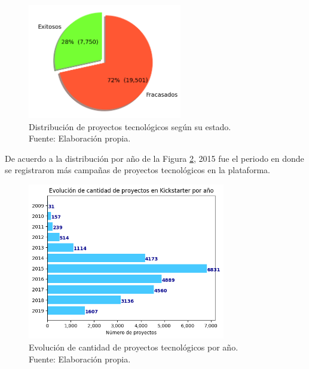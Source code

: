\begin{figure}[!ht]
	\begin{center}
		\includegraphics[width=0.60\textwidth]{4/figures/projects by state.png}
		\caption[Distribución de proyectos tecnológicos según su estado]{Distribución de proyectos tecnológicos según su estado.\\
			Fuente: Elaboración propia.}
		\label{4:fig8}
	\end{center}
\end{figure}

\newpage
De acuerdo a la distribución por año de la Figura \ref{4:fig9}, 2015 fue el periodo en donde se registraron más campañas de proyectos tecnológicos en la plataforma.

\begin{figure}[!ht]
	\begin{center}
		\includegraphics[width=0.77\textwidth]{4/figures/projects state by year.png}
		\caption[Evolución de cantidad de proyectos tecnológicos por año]{Evolución de cantidad de proyectos tecnológicos por año.\\
			Fuente: Elaboración propia.}
		\label{4:fig9}
	\end{center}
\end{figure}

